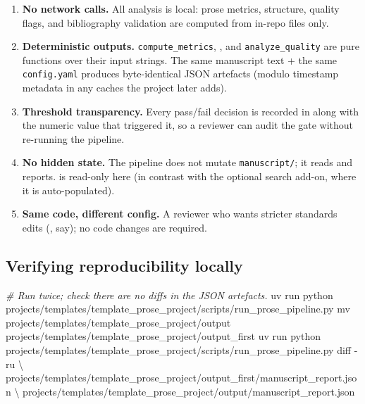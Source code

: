 \documentclass[
]{article}
\newenvironment{Shaded}{}{}
\newcommand{\AttributeTok}[1]{\textcolor[rgb]{0.49,0.56,0.16}{#1}}
\newcommand{\CommentTok}[1]{\textcolor[rgb]{0.38,0.63,0.69}{\textit{#1}}}
\newcommand{\DataTypeTok}[1]{\textcolor[rgb]{0.56,0.13,0.00}{#1}}
\newcommand{\ExtensionTok}[1]{#1}
\newcommand{\FunctionTok}[1]{\textcolor[rgb]{0.02,0.16,0.49}{#1}}
\newcommand{\NormalTok}[1]{#1}
\providecommand{\tightlist}{%
  \setlength{\itemsep}{0pt}\setlength{\parskip}{0pt}}
\begin{document}
\begin{enumerate}
\def\labelenumi{\arabic{enumi}.}
\tightlist
\item
  \textbf{No network calls.} All analysis is local: prose metrics,
  structure, quality flags, and bibliography validation are computed
  from in-repo files only.
\item
  \textbf{Deterministic outputs.} \texttt{compute\_metrics},
  , and \texttt{analyze\_quality} are pure
  functions over their input strings. The same manuscript text + the
  same \texttt{config.yaml} produces byte-identical JSON artefacts
  (modulo timestamp metadata in any caches the project later adds).
\item
  \textbf{Threshold transparency.} Every pass/fail decision is recorded
  in  along with the numeric value that
  triggered it, so a reviewer can audit the gate without re-running the
  pipeline.
\item
  \textbf{No hidden state.} The pipeline does not mutate
  \texttt{manuscript/}; it reads and reports.
   is read-only here (in contrast with
  the optional search add-on, where it is auto-populated).
\item
  \textbf{Same code, different config.} A reviewer who wants stricter
  standards edits 
  (, say); no code
  changes are required.
\end{enumerate}

\subsection{Verifying reproducibility
locally}\label{verifying-reproducibility-locally}

\begin{Shaded}
\begin{Highlighting}[]
\CommentTok{\# Run twice; check there are no diffs in the JSON artefacts.}
\ExtensionTok{uv}\NormalTok{ run python projects/templates/template\_prose\_project/scripts/run\_prose\_pipeline.py}
\FunctionTok{mv}\NormalTok{ projects/templates/template\_prose\_project/output projects/templates/template\_prose\_project/output\_first}
\ExtensionTok{uv}\NormalTok{ run python projects/templates/template\_prose\_project/scripts/run\_prose\_pipeline.py}
\FunctionTok{diff} \AttributeTok{{-}ru} \DataTypeTok{\textbackslash{}}
\NormalTok{    projects/templates/template\_prose\_project/output\_first/manuscript\_report.json }\DataTypeTok{\textbackslash{}}
\NormalTok{    projects/templates/template\_prose\_project/output/manuscript\_report.json}
\end{Highlighting}
\end{Shaded}
\end{document}
